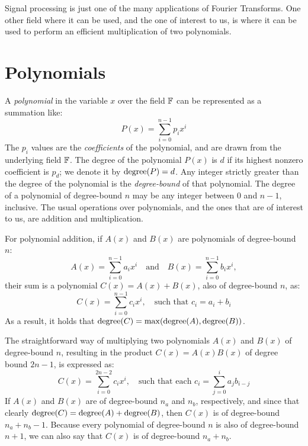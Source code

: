 Signal processing is just one of the many applications of Fourier Transforms.
One other field where it can be used, and the one of interest to us, is where
it can be used to perform an efficient multiplication of two polynomials.

\section{Polynomials}
A \emph{polynomial} in the variable $x$ over the field $\mathbb{F}$ can be
represented as a summation like:
\begin{equation*}
  P(x) = \sum_{i = 0}^{n - 1}{p_i x^i}
\end{equation*}
The $p_i$ values are the \emph{coefficients} of the polynomial, and are drawn
from the underlying field $\mathbb{F}$. The degree of the polynomial $P(x)$ is $d$ if
its highest nonzero coefficient is $p_d$; we denote it by $\operatorname{degree}(P) = d$. Any
integer strictly greater than the degree of the polynomial is the
\emph{degree-bound} of that polynomial. The degree of a polynomial of
degree-bound $n$ may be any integer between $0$ and $n - 1$, inclusive. The
usual operations over polynomials, and the ones that are of interest to us, are
addition and multiplication.

For polynomial addition, if $A(x)$ and $B(x)$ are polynomials of degree-bound
$n$:
\begin{equation*}
  A(x) = \sum_{i = 0}^{n - 1}{a_i x^i}
  \quad
  \text{and}
  \quad
  B(x) = \sum_{i = 0}^{n - 1}{b_i x^i},
\end{equation*}
their sum is a polynomial $C(x) = A(x) + B(x)$, also of degree-bound $n$, as:
\begin{equation}
  C(x) = \sum_{i = 0}^{n - 1}{c_i x^i},
  \quad \text{such that $c_i = a_i + b_i$}
  \label{eq:poly_sum1}
\end{equation}
As a result, it holds that $\operatorname{degree}(C) = \max(\operatorname{degree}(A), \operatorname{degree}(B))$.

The straightforward way of multiplying two polynomials $A(x)$ and $B(x)$ of
degree-bound $n$, resulting in the product $C(x) = A(x) B(x)$ of degree bound
$2n - 1$, is expressed as:
\begin{equation}
  C(x) = \sum_{i = 0}^{2n-2}{c_i x^i},
  \quad \text{such that each $c_i = \sum_{j = 0}^{i}{a_j b_{i - j}}$}
  \label{eq:poly_mul1}
\end{equation}
If $A(x)$ and $B(x)$ are of degree-bound $n_a$ and $n_b$, respectively, and
since that clearly $\operatorname{degree}(C) = \operatorname{degree}(A) + \operatorname{degree}(B)$, then $C(x)$ is of
degree-bound $n_a + n_b - 1$. Because every polynomial of degree-bound $n$ is
also of degree-bound $n + 1$, we can also say that $C(x)$ is of degree-bound
$n_a + n_b$.


